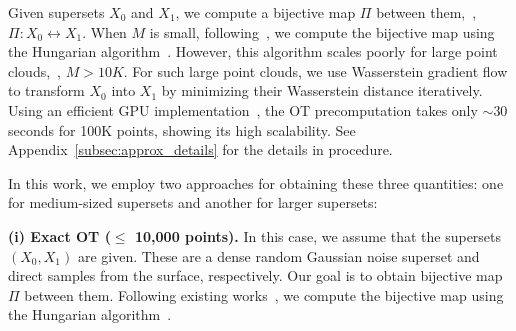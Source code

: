 %
%
%

%
Given supersets $X_0$ and $X_1$, we compute a bijective map $\Pi$ between them,~\ie, $\Pi: X_0 \leftrightarrow X_1$. When $M$ is small, following~\cite{song2024equivariant,klein2024equivariant}, we compute the bijective map using the Hungarian algorithm~\cite{kuhn1955hungarian}. However, this algorithm scales poorly for large point clouds,~\ie, $M>10K$. For such large point clouds, we use Wasserstein gradient flow to transform
$X_0$ into $X_1$ by minimizing their Wasserstein distance iteratively. Using an efficient GPU implementation~\cite{feydy2019interpolating}, the OT precomputation takes only ${\sim}30$ seconds for 100K points, showing its high scalability. 
See Appendix~\ref{subsec:approx_details} for the details in procedure.


\iffalse
In this work, we employ two approaches for obtaining these three quantities: one for medium-sized supersets and another for larger supersets:

\textbf{(i) Exact OT ($\leq$ 10,000 points).} In this case, we assume that the supersets $(X_0, X_1)$ are given. These are a dense random Gaussian noise superset and direct samples from the surface, respectively. 
Our goal is to obtain bijective map $\Pi$ between them.
%
Following existing works~\cite{song2024equivariant,klein2024equivariant}, we compute the bijective map using the Hungarian algorithm~\cite{kuhn1955hungarian}. 
%
%

